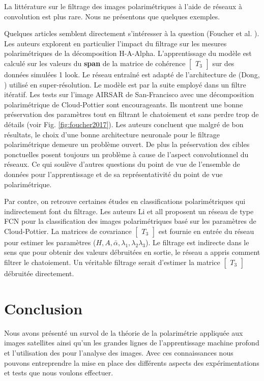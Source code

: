 La littérature sur le filtrage des images polarimétriques à l'aide de réseaux à convolution est plus rare.  Nous ne présentons que quelques exemples. 

Quelques articles semblent directement s'intéresser à la question (Foucher et al. \cite{Foucher2017}).  Les auteurs explorent en particulier l'impact du filtrage sur les mesures polarimétriques de la décomposition H-A-Alpha. L'apprentissage du modèle est calculé sur les valeurs du \textbf{span} de la matrice de cohérence $\begin{bmatrix} T_3 \end{bmatrix}$ sur des données simulées 1 look.  Le réseau entraîné est adapté de l'architecture de (Dong, \cite{Dong2016}) utilisé en super-résolution. Le modèle est par la suite employé dans un filtre itératif. Les tests sur l'image AIRSAR de San-Francisco avec une décomposition polarimétrique de Cloud-Pottier sont encourageants. Ils montrent une bonne préservation des paramètres tout en filtrant le chatoiement et sans perdre trop de détails (voir Fig. \ref{fig:foucher2017}).  Les auteurs concluent que malgré de bon résultats, le choix d'une bonne architecture neuronale pour le filtrage polarimétrique demeure un problème ouvert.  De plus la préservation des cibles ponctuelles posent toujours un problème à cause de l'aspect convolutionnel du réseaux.  Ce qui soulève d'autres questions du  point de vue de l'ensemble de données pour l'apprentissage et de sa représentativité du point de vue polarimétrique.

 Par contre, on retrouve certaines études en classifications polarimétriques qui indirectement font du filtrage.  Les auteurs Li et all \cite{Li2018Classification} proposent un réseau de type FCN pour la classification des images polarimétriques basé sur les paramètres de Cloud-Pottier.  La matrices de covariance $\begin{bmatrix} T_3 \end{bmatrix}$ est fournie en entrée du réseau pour estimer les  paramètres ($H, A, \bar \alpha, \lambda_1,  \lambda_2  \lambda_3$).  Le filtrage est indirecte dans le sens que pour obtenir des valeurs débruitées en sortie, le réseau a appris comment filtrer le chatoiement.  Un véritable filtrage serait d'estimer la matrice  $\begin{bmatrix} T_3 \end{bmatrix}$ débruitée directement.


\section{Conclusion}

Nous avons présenté un survol de la théorie de la polarimétrie appliquée aux images satellites \acrpolsar ainsi qu'un les grandes lignes de l'apprentissage machine profond et l'utilisation des \acrconvnet pour l'analyse des images. Avec ces connaissances nous pouvons entreprendre la mise en place des différents aspects des expérimentations et tests que nous voulons effectuer.
